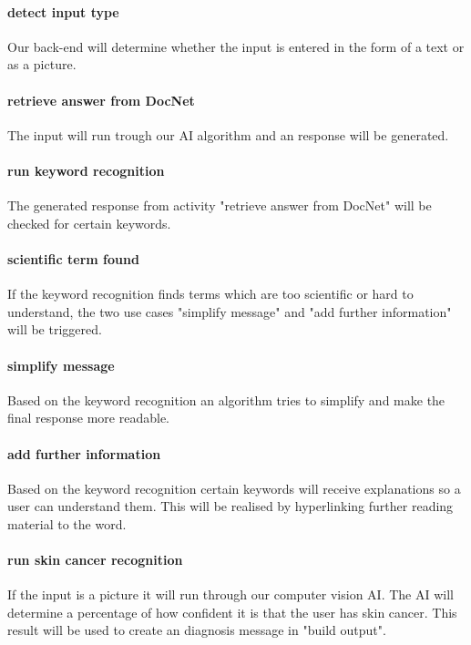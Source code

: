 \paragraph{detect input type}
Our back-end will determine whether the input is entered in the form of a text or as a picture.

\paragraph{retrieve answer from DocNet}
The input will run trough our AI algorithm and an response will be generated.

\paragraph{run keyword recognition}
The generated response from activity "retrieve answer from DocNet" will be checked for certain keywords.

\paragraph{scientific term found}
If the keyword recognition finds terms which are too scientific or hard to understand, the two use cases "simplify message" and "add further information" will be triggered. 

\paragraph{simplify message}
Based on the keyword recognition an algorithm tries to simplify and make the final response more readable.

\paragraph{add further information}
Based on the keyword recognition certain keywords will receive explanations so a user can understand them. This will be realised by hyperlinking further reading material to the word.

\paragraph{run skin cancer recognition}
If the input is a picture it will run through our computer vision AI. The AI will determine a percentage of how confident it is that the user has skin cancer. This result will be used to create an diagnosis message in "build output".

